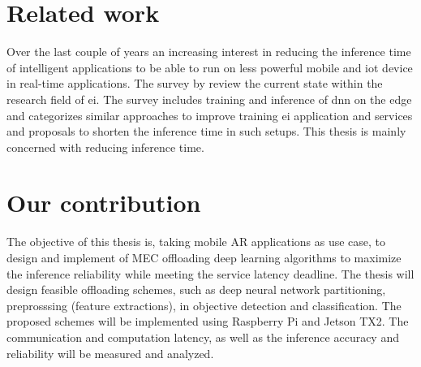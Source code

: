 \section{Related work}



Over the last couple of years an increasing interest in reducing the inference time of intelligent applications to be able to run on less powerful mobile and \gls{iot} device in real-time applications. The survey  by \citet{zhou_edge_2019} review the current state within the research field of \gls{ei}. The survey includes training and inference of \gls{dnn} on the edge and categorizes similar approaches to improve training \gls{ei} application and services and proposals to shorten the inference time in such setups. This thesis is mainly concerned with reducing inference time.

\section{Our contribution}

The objective of this thesis is, taking mobile AR applications as use case, to design and implement of MEC offloading deep learning algorithms to maximize the inference reliability while meeting the service latency deadline. The thesis will design feasible offloading schemes, such as deep neural network partitioning, preprosssing (feature extractions), in objective detection and classification. The proposed schemes will be implemented using Raspberry Pi and Jetson TX2. The communication and computation latency, as well as the inference accuracy and reliability will be measured and analyzed.

